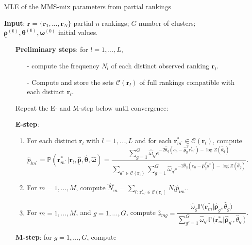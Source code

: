 \begin{algorithm}[h!]\small
\caption{MLE of the MMS-mix parameters from partial rankings}
\label{alg:partial_mixture}
\hspace*{\algorithmicindent} \textbf{Input}: $\underline{\bm{r}}=\{\bm{r}_1,\dots,\bm{r}_N\}$ partial $n$-rankings; $G$ number of clusters; $\underline{\bm{\rho}}^{(0)}, \bm{\theta}^{(0)}, \bm{\omega}^{(0)}$ initial values.
\begin{enumerate}
\item[] \textbf{Preliminary steps}: for $l=1,\dots,L$,
\begin{itemize}
    \item[-] compute the frequency $N_l$ of each distinct observed ranking $\bm{r}_l$.
    \item[-] Compute and store the sets $\mathcal{C}(\bm r_l)$ of full rankings compatible with each distinct $\bm{r}_l$.
\end{itemize}
     \item[] Repeat the E- and M-step below until convergence:
    \item[] \textbf{E-step}:
    \begin{enumerate}
        \item For each distinct $\bm r_l$ with $l=1,\dots,L$ and for each $\bm{r}^*_{m^\prime}\in\mathcal{C}(\bm r_l)$, compute
        \vspace{-1mm}
$$\hat{p}_{lm^\prime}=\mathbb{P}(\bm{r}^*_{m^\prime}\,|\bm{r}_l,\underline{\hat{\bm{\rho}}},{\hat{\bm\theta}},{\hat{\bm\omega}})
=\frac{\sum_{g=1}^G \hat\omega_g e^{-2\hat\theta_g\left(c_n-{\hat{\bm{\rho}}_g^T}\bm{r}^*_{m^\prime}\right)-\log Z\left(\hat\theta_g\right)}}{\sum_{\bm{s}^*\in \mathcal{C}(\bm{r}_l)}\sum_{g=1}^G \hat\omega_ge^{-2\hat\theta_g\left(c_n-\hat{\bm{\rho}}^T_{g}\bm{s}^*\right)-\log Z\left(\hat\theta_g\right)}}
.$$
\vspace{-3mm}
\item For $m=1,\dots,M$, compute
$
\hat{N}_m=\sum_{l:\,\bm{r}^*_{m^\prime}\in\mathcal{C}(\bm{r}_l)} N_l \hat{p}_{lm^\prime}
$.
\vspace{-3mm}
        \item For $m=1,\dots,M$, and $g=1,\dots,G$, compute
$\hat z_{mg}=\dfrac{\hat\omega_g\mathbb{P}\big(\bm{r}^*_m\big\vert\hat{\bm{\rho}}_g,\hat\theta_g\big)}{\sum_{g'=1}^G\hat\omega_{g'}\mathbb{P}\big(\bm{r}^*_m\big\vert\hat{\bm{\rho}}_{g'},\hat\theta_{g'}\big)}$.
\vspace{-3mm}
    \end{enumerate}
    \item[] \textbf{M-step}: for $g=1,\dots,G$, compute

\end{enumerate}
\end{algorithm}
